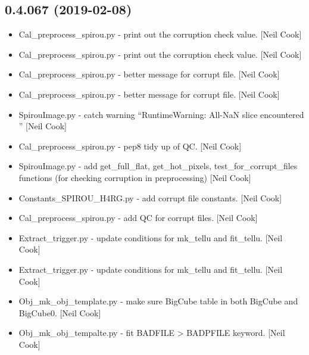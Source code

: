 \documentclass[a4paper,10pt,english]{report}
\begin{document}
\subsection{0.4.067 (2019-02-08)}
\label{\detokenize{misc/changelog:id189}}\begin{itemize}
\item {} 
Cal\_preprocess\_spirou.py - print out the corruption check value. {[}Neil
Cook{]}

\item {} 
Cal\_preprocess\_spirou.py - print out the corruption check value. {[}Neil
Cook{]}

\item {} 
Cal\_preprocess\_spirou.py - better message for corrupt file. {[}Neil
Cook{]}

\item {} 
Cal\_preprocess\_spirou.py - better message for corrupt file. {[}Neil
Cook{]}

\item {} 
SpirouImage.py - catch warning “RuntimeWarning: All-NaN slice
encountered ” {[}Neil Cook{]}

\item {} 
Cal\_preprocess\_spirou.py - pep8 tidy up of QC. {[}Neil Cook{]}

\item {} 
SpirouImage.py - add get\_full\_flat, get\_hot\_pixels,
test\_for\_corrupt\_files functions (for checking corruption in
preprocessing) {[}Neil Cook{]}

\item {} 
Constants\_SPIROU\_H4RG.py - add corrupt file constants. {[}Neil Cook{]}

\item {} 
Cal\_preprocess\_spirou.py - add QC for corrupt files. {[}Neil Cook{]}

\item {} 
Extract\_trigger.py - update conditions for mk\_tellu and fit\_tellu.
{[}Neil Cook{]}

\item {} 
Extract\_trigger.py - update conditions for mk\_tellu and fit\_tellu.
{[}Neil Cook{]}

\item {} 
Obj\_mk\_obj\_template.py - make sure BigCube table in both BigCube and
BigCube0. {[}Neil Cook{]}

\item {} 
Obj\_mk\_obj\_tempalte.py - fit BADFILE \textendash{}\textgreater{} BADPFILE keyword. {[}Neil Cook{]}


\end{itemize}
\end{document}
